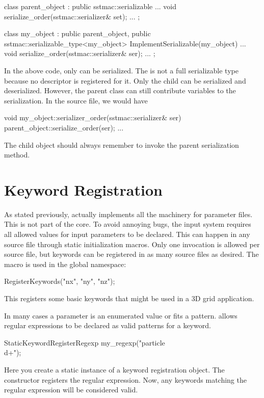 \begin{CppCode}
class parent_object : 
  public sstmac::serializable
{
...
  void
  serialize_order(sstmac::serializer& set);
...
};

class my_object :
  public parent_object,
  public sstmac::serializable_type<my_object>
{
 ImplementSerializable(my_object)
 ...
 void
 serialize_order(sstmac::serializer& ser);
 ...
};
\end{CppCode}
In the above code, only  can be serialized.
The  is not a full serializable type because no descriptor is registered for it.
Only the child can be serialized and deserialized.
However, the parent class can still contribute variables to the serialization.
In the source file, we would have

\begin{CppCode}
void
my_object::serializer_order(sstmac::serializer& ser)
{
  parent_object::serialize_order(ser);
  ...
}
\end{CppCode}
The child object should always remember to invoke the parent serialization method.

\section{Keyword Registration}\label{sec:keywords}
As stated previously, \sprockit actually implements all the machinery for parameter files.
This is not part of the \sstmacro core.
To avoid annoying bugs, the \sprockit input system requires all allowed values for input parameters to be declared.
This can happen in any source file through static initialization macros.
Only one invocation is allowed per source file,
but keywords can be registered in as many source files as desired.
The macro is used in the global namespace:

\begin{CppCode}
RegisterKeywords("nx", "ny", "nz");
\end{CppCode}
This registers some basic keywords that might be used in a 3D grid application.

In many cases a parameter is an enumerated value or fits a pattern.
\sprockit allows regular expressions to be declared as valid patterns for a keyword.

\begin{CppCode}
StaticKeywordRegisterRegexp my_regexp("particle\\d+");
\end{CppCode}
Here you create a static instance of a keyword registration object.
The constructor registers the regular expression.
Now, any keywords matching the regular expression will be considered valid.



